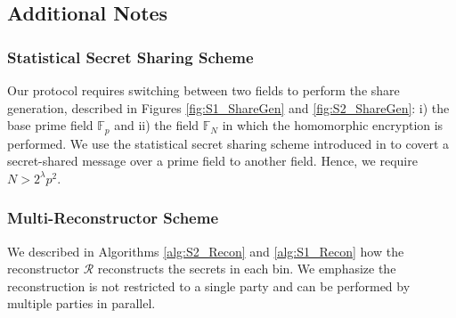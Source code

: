 \subsection{Additional Notes}
\label{sec:addnotes}
\subsubsection{Statistical Secret Sharing Scheme}
Our protocol requires switching between two fields to perform the share generation, described in Figures \ref{fig:S1_ShareGen} and \ref{fig:S2_ShareGen}: i) the base prime field $\mathbb{F}_p$ and ii) the field $\mathbb{F}_N$ in which the homomorphic encryption is performed. We use the statistical secret sharing scheme introduced in  \cite{Statistical_SSS} to covert a secret-shared message over a prime field to another field.  Hence, we require $N > 2^\lambda p^2$.
\subsubsection{Multi-Reconstructor Scheme}
We described in Algorithms \ref{alg:S2_Recon} and \ref{alg:S1_Recon} how the reconstructor $\mathcal{R}$ reconstructs the secrets in each bin. We emphasize the reconstruction is not restricted to a single party and can be performed by multiple parties in parallel. 
